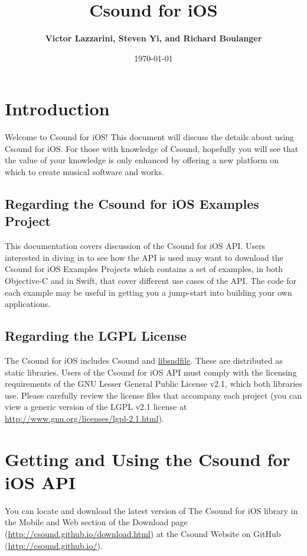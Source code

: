 \documentclass[11pt]{article}
\author{\textbf{Victor Lazzarini, Steven Yi, and Richard Boulanger}}
\date{\today}
\title{\textbf{Csound for iOS}}
\begin{document}
\maketitle

\section{Introduction}

Welcome to Csound for iOS! This document will discuss the details about using Csound for iOS. For those with knowledge of Csound, hopefully you will see that the value of your knowledge is only enhanced by offering a new platform on which to create musical software and works.

\subsection{Regarding the Csound for iOS Examples Project}

This documentation covers discussion of the Csound for iOS API.  Users interested in diving in to see how the API is used may want to download the Csound for iOS Examples Projects which contains a set of examples, in both Objective-C and in Swift, that cover different use cases of the API. The code for each example may be useful in getting you a jump-start into building your own applications.

\subsection{Regarding the LGPL License}

The Csound for iOS includes Csound and \href{http://mega-nerd.com/libsndfile/}{libsndfile}. These are distributed as static libraries. Users of the Csound for iOS API must comply with the licensing requirements of the GNU Lesser General Public License v2.1, which both libraries use. Please carefully review the license files that accompany each project (you can view a generic version of the LGPL v2.1 license at \href{http://www.gnu.org/licenses/lgpl-2.1.html}{http://www.gnu.org/licenses/lgpl-2.1.html}).


\section{Getting and Using the Csound for iOS API}

You can locate and download the latest version of The Csound for iOS library in the Mobile and Web section of the Download page (\url{http://csound.github.io/download.html}) at the Csound Website on GitHub (\url{http://csound.github.io/}). 
\end{document}
